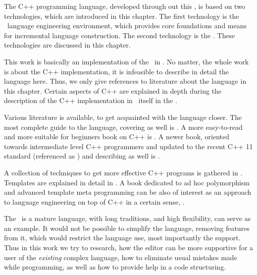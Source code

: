 
The C++ programming language, developed through out this \MT, is based on two technologies, which are 
introduced in this chapter. The first technology is the \jbmps\ language engineering environment, which 
provides core foundations and means for incremental language construction. The second technology is
the \mbdp. These technologies are discussed in this chapter.








This work is basically an implementation of the \cpppl\ in \jbmps. No matter, the whole work 
is about the C++ implementation, it is infeasible to describe in detail the language 
here. Thus, we only give references to literature about the language in this chapter. Certain 
aspects of C++ are explained in depth during the description of the C++ implementation in \jbmps\ itself in 
the .

Various literature is available, to get acquainted with the language closer. The most complete
guide to the language, covering  as well is \cite{stroustrupcpp2000}. A more 
easy-to-read and more suitable for beginners book on C++ is \cite{schildtcpp}. A newer book,
oriented towards intermediate level C++ programmers and updated to the recent C++ 11 standard (referenced as \cite{cpp11}) and describing 
 as well is \cite{pratacpp}.

A collection of techniques to get more effective C++ programs is gathered in \cite{meyerseffcpp}. Templates are explained in 
detail in \cite{josuttistemplates}. A book dedicated to ad hoc polymorphism and advanced template meta programming can be 
also of interest as an approach to language engineering on top of C++ in a certain sense, \cite{alexandrescu}.

The \cpppl\ is a mature language, with long traditions, and high flexibility, \cite{alexandrescu} can serve as an example. 
It would not be possible to simplify the language, removing features from it, which would restrict the language use, 
most importantly the  support. Thus in this work we try to research, how the editor can be more supportive 
for a user of the \emph{existing} complex language, how to eliminate usual mistakes made while programming, as 
well as how to provide help in a code structuring.